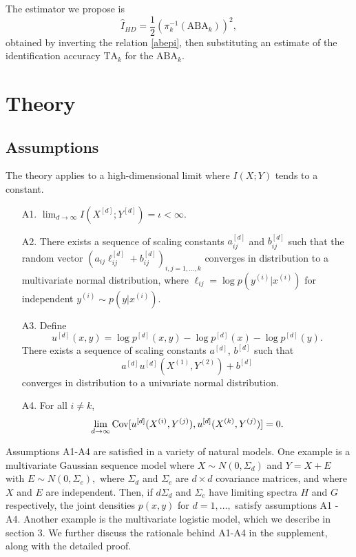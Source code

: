 The estimator we propose is
\begin{equation}\label{eq:hat_i_hd}
\hat{I}_{HD} = \frac{1}{2}(\pi_{k}^{-1}(\text{ABA}_k))^2,
\end{equation}
obtained by inverting the relation \eqref{abepi}, then substituting
an estimate of the identification accuracy $\text{TA}_k$ for the $\text{ABA}_k$.  

\section{Theory}

\subsection{Assumptions}\label{sec:ch5_assumptions}

The theory applies to a high-dimensional limit where $I(X; Y)$ tends to a constant.

\begin{itemize}
\item[A1.] $\lim_{d \to \infty} I(X^{[d]}; Y^{[d]}) = \iota < \infty.$
\item[A2.] There exists a sequence of scaling constants $a_{ij}^{[d]}$
and $b_{ij}^{[d]}$ such that the random vector $(a_{ij}\ell_{ij}^{[d]} +
b_{ij}^{[d]})_{i, j = 1,\hdots, k}$ converges in distribution to a
multivariate normal distribution,
where $\ell_{ij} = \log p(y^{(i)}|x^{(i)})$ for independent $y^{(i)} \sim p(y|x^{(i)})$.
\item[A3.] Define \[
u^{[d]}(x, y) = \log p^{[d]}(x, y) - \log p^{[d]}(x) - \log p^{[d]}(y).
\]
There exists a sequence of scaling constants $a^{[d]}$, $b^{[d]}$ such that
\[
a^{[d]}u^{[d]}(X^{(1)}, Y^{(2)}) + b^{[d]}
\]
converges in distribution to a univariate normal distribution.
\item[A4.] For all $i \neq k$,
\[\lim_{d \to \infty}\text{Cov}[u^{[d]}(X^{(i)}, Y^{(j)}), u^{[d]}(X^{(k)}, Y^{(j)})] = 0.\]
\end{itemize}

Assumptions A1-A4 are satisfied in a variety of natural models.  One
example is a multivariate Gaussian sequence model where $X \sim N(0,
\Sigma_d)$ and $ Y = X + E $ with $ E \sim N(0, \Sigma_e), $ where
$\Sigma_d$ and $\Sigma_e$ are $d \times d$ covariance matrices, and
where $X$ and $E$ are independent.  Then, if $d \Sigma_d$ and
$\Sigma_e$ have limiting spectra $H$ and $G$ respectively, the joint
densities $p(x, y)$ for $d = 1,\hdots, $ satisfy assumptions A1 - A4.
Another example is the multivariate logistic model, which we describe
in section 3.  We further discuss the rationale behind A1-A4 in the
supplement, along with the detailed proof.

